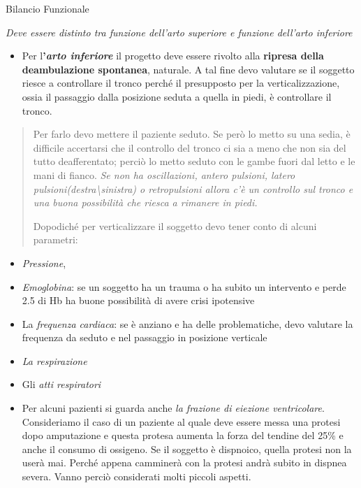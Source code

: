 \documentclass[]{article}
\begin{document}
Bilancio Funzionale

\emph{Deve essere distinto tra funzione dell'arto superiore e funzione
dell'arto inferiore}

\begin{itemize}
\item
  Per l\textbf{'\emph{arto inferiore }}il progetto deve essere rivolto
  alla \textbf{ripresa della deambulazione spontanea}, naturale. A tal
  fine devo valutare se il soggetto riesce a controllare il tronco
  perché il presupposto per la verticalizzazione, ossia il passaggio
  dalla posizione seduta a quella in piedi, è controllare il tronco.
\end{itemize}

\begin{quote}
Per farlo devo mettere il paziente seduto. Se però lo metto su una
sedia, è difficile accertarsi che il controllo del tronco ci sia a meno
che non sia del tutto deafferentato; perciò lo metto seduto con le gambe
fuori dal letto e le mani di fianco. \emph{Se non ha oscillazioni,
antero pulsioni, latero pulsioni(destra\textbackslash{}sinistra) o
retropulsioni allora c'è un controllo sul tronco e una buona possibilità
che riesca a rimanere in piedi.}

Dopodiché per verticalizzare il soggetto devo tener conto di alcuni
parametri:
\end{quote}

\begin{itemize}
\item
  \emph{Pressione},
\item
  \emph{Emoglobina}: se un soggetto ha un trauma o ha subito un
  intervento e perde 2.5 di Hb ha buone possibilità di avere crisi
  ipotensive
\item
  La \emph{frequenza cardiaca}: se è anziano e ha delle problematiche,
  devo valutare la frequenza da seduto e nel passaggio in posizione
  verticale
\item
  \emph{La respirazione}
\item
  Gli \emph{atti respiratori}
\item
  Per alcuni pazienti si guarda anche \emph{la frazione di eiezione
  ventricolare}. Consideriamo il caso di un paziente al quale deve
  essere messa una protesi dopo amputazione e questa protesa aumenta la
  forza del tendine del 25\% e anche il consumo di ossigeno. Se il
  soggetto è dispnoico, quella protesi non la userà mai. Perché appena
  camminerà con la protesi andrà subito in dispnea severa. Vanno perciò
  considerati molti piccoli aspetti.
\end{itemize}
\end{document}
